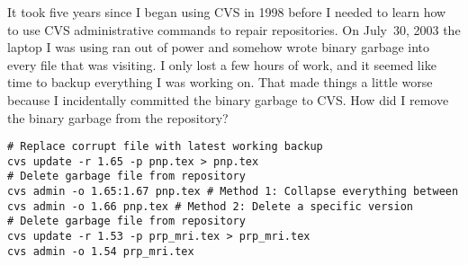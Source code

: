 \documentclass[12pt,twoside]{article}
\begin{document}
It took five years since I began using CVS in 1998 before I needed to
learn how to use CVS administrative commands to repair repositories.
On July~30, 2003 the laptop I was using ran out of power and somehow
wrote binary garbage into every file that  was
visiting. 
I only lost a few hours of work, and it seemed like time to backup 
everything I was working on.
That made things a little worse because I incidentally committed the
binary garbage to CVS. 
How did I remove the binary garbage from the repository?
\begin{verbatim}
# Replace corrupt file with latest working backup
cvs update -r 1.65 -p pnp.tex > pnp.tex
# Delete garbage file from repository
cvs admin -o 1.65:1.67 pnp.tex # Method 1: Collapse everything between 
cvs admin -o 1.66 pnp.tex # Method 2: Delete a specific version
# Delete garbage file from repository
cvs update -r 1.53 -p prp_mri.tex > prp_mri.tex
cvs admin -o 1.54 prp_mri.tex
\end{verbatim}
\end{document}
